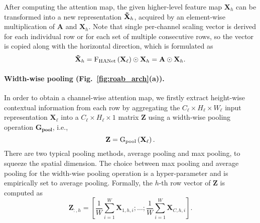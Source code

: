 \documentclass[10pt,twocolumn,letterpaper]{article}
\begin{document}
After computing the attention map, the given higher-level feature map $\mathbf{X}_h$ can be transformed into a new representation $\mathbf{\Tilde{X}}_h$, acquired by an element-wise multiplication of $\mathbf{A}$ and $\mathbf{X}_h$. Note that single per-channel scaling vector is derived for each individual row or for each set of multiple consecutive rows, so the vector is copied along with the horizontal direction, which is formulated as \begin{equation}
    \mathbf{\Tilde{X}}_h=\text{F}_{\text{HANet}}\left(\mathbf{X}_{\ell}\right)\odot\mathbf{X}_h=\mathbf{A}\odot\mathbf{X}_h.
\end{equation}    

\paragraph{Width-wise pooling (Fig.~\ref{fig:roab_arch}(a)).} \label{pooling}
\vspace*{-0.2cm}
In order to obtain a channel-wise attention map, we firstly extract height-wise contextual information from each row by aggregating the $C_\ell\times H_\ell\times W_\ell$ input representation $\mathbf{X}_\ell$ into a $C_\ell\times H_\ell\times 1$ matrix $\mathbf{Z}$ using a width-wise pooling operation $\mathbf{\text{G}_{\text{pool}}}$, i.e., 
\vspace*{-0.1cm}
\begin{equation}
    \mathbf{Z}=\text{G}_{\text{pool}}\left(\mathbf{X}_\ell\right).
\vspace*{-0.1cm}
\end{equation}
There are two typical pooling methods, average pooling and max pooling, to squeeze the spatial dimension. The choice between max pooling and average pooling for the width-wise pooling operation is a hyper-parameter and is empirically set to average pooling. Formally, the $h$-th row vector of $\mathbf{Z}$ is computed as
\begin{equation}
    \mathbf{Z}_{:,h}=[\frac{1}{W}\sum_{i=1}^W\mathbf{X}_{1,h,i};\dots;\frac{1}{W}\sum_{i=1}^W\mathbf{X}_{C,h,i}].
\end{equation}
\end{document}

